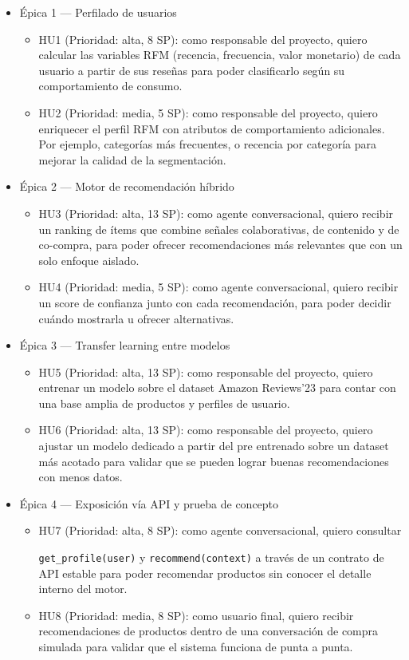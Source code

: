 \documentclass[
11pt, %
]{charter}
\begin{document}
\begin{itemize}
  \item \'{E}pica 1 --- Perfilado de usuarios
    \begin{itemize}
      \item HU1 (Prioridad: alta, 8 SP): como responsable del proyecto, quiero calcular las variables RFM (recencia, frecuencia, valor monetario) de cada usuario a partir de sus reseñas para poder clasificarlo según su comportamiento de consumo.
      \item HU2 (Prioridad: media, 5 SP): como responsable del proyecto, quiero enriquecer el perfil RFM con atributos de comportamiento adicionales. Por ejemplo, categorías más frecuentes, o recencia por categoría para mejorar la calidad de la segmentación.
    \end{itemize}
  \item \'{E}pica 2 --- Motor de recomendación híbrido
    \begin{itemize}
      \item HU3 (Prioridad: alta, 13 SP): como agente conversacional, quiero recibir un ranking de ítems que combine señales colaborativas, de contenido y de co-compra, para poder ofrecer recomendaciones más relevantes que con un solo enfoque aislado.
      \item HU4 (Prioridad: media, 5 SP): como agente conversacional, quiero recibir un score de confianza junto con cada recomendación, para poder decidir cuándo mostrarla u ofrecer alternativas.
    \end{itemize}
  \item \'{E}pica 3 --- Transfer learning entre modelos
    \begin{itemize}
      \item HU5 (Prioridad: alta, 13 SP): como responsable del proyecto, quiero entrenar un modelo sobre el dataset Amazon Reviews'23 para contar con una base amplia de productos y perfiles de usuario.
      \item HU6 (Prioridad: alta, 13 SP): como responsable del proyecto, quiero ajustar un modelo dedicado a partir del pre entrenado sobre un dataset más acotado para validar que se pueden lograr buenas recomendaciones con menos datos.
    \end{itemize}
  \item \'{E}pica 4 --- Exposición vía API y prueba de concepto
    \begin{itemize}
      \item HU7 (Prioridad: alta, 8 SP): como agente conversacional, quiero consultar
      
      \texttt{get\_profile(user)} y \texttt{recommend(context)} a través de un contrato de API estable para poder recomendar productos sin conocer el detalle interno del motor.
      \item HU8 (Prioridad: media, 8 SP): como usuario final, quiero recibir recomendaciones de productos dentro de una conversación de compra simulada para validar que el sistema funciona de punta a punta.
    \end{itemize}
\end{itemize}
\end{document}
